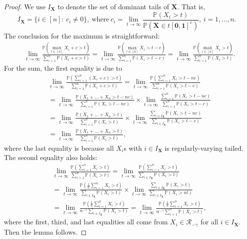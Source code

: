 \documentclass[12pt]{article}
\theoremstyle{plain}
\theoremstyle{plain}
\theoremstyle{definition}
\renewcommand{\Pr}{\mathbb{P}}
\begin{document}
\begin{proof}
We use $I_{\mathbf{X}}$ to denote the set of dominant tails of $\mathbf{X}$. That is,
\[
I_{\mathbf{X}}=\{i\in[n]:~c_i\neq0\},~\mathrm{where}~c_i=\lim_{t\to\infty}\frac{\Pr(X_i>t)}{\Pr(\mathbf{X}\in t[\mathbf{0},\mathbf{1}]^c)},~i=1,\dots,n.
\]
The conclusion for the maximum is straightforward:
\begin{align*}
&\lim_{t\to\infty}\frac{\Pr(\max_{i\in[n]} X_i+c>t)}{\sum_{i=1}^n\Pr(X_i+c>t)}
=\lim_{t\to\infty}\frac{\Pr(\max_{i\in[n]} X_i>t-c)}{\sum_{i=1}^n\Pr(X_i>t-c)}
=\lim_{t\to\infty}\frac{\Pr(\max_{i\in[n]} X_i>t)}{\sum_{i=1}^n\Pr(X_i>t)}.
\end{align*}
For the sum, the first equality is due to 
\begin{align*}
&\lim_{t\to\infty}\frac{\Pr(\sum_{i=1}^n (X_i+c)>t)}{\sum_{i=1}^n\Pr(X_i+c>t)}
=\lim_{t\to\infty}\frac{\Pr(\sum_{i=1}^n X_i>t - n c)}{\sum_{i=1}^n\Pr(X_i>t-c)}\\
&=\lim_{t\to\infty}\frac{\Pr( X_1+\dots+ X_n>t - n c)}{\sum_{i=1}^n\Pr( X_i>t - n c)}\times\lim_{t\to\infty}\frac{\sum_{i=1}^n\Pr(X_i>t - n c)}{\sum_{i=1}^n\Pr(X_i>t-c)}\\
&=\lim_{t\to\infty}\frac{\Pr(X_1 + \dots + X_n > t)}{\sum_{i=1}^n\Pr(X_i>t)}
\times\lim_{t\to\infty}\frac{\sum_{i\in I_{\mathbf{X}}}\Pr(X_i>t - n c)}{\sum_{i\in I_{\mathbf{X}}}\Pr(X_i>t-c)} \\
&=\lim_{t\to\infty}\frac{\Pr(X_1 + \dots + X_n > t)}{\sum_{i=1}^n\Pr(X_i>t)},
\end{align*}
where the last equality is because all $X_i$s with $i\in I_{\mathbf{X}}$ is regularly-varying tailed. 
The second equality also holds:
\begin{align*}
&\lim_{t\to\infty}\frac{\Pr(\sum_{i=1}^n X_i>t)}{\sum_{i=1}^n\Pr(X_i>t)}
=\lim_{t\to\infty}\frac{\Pr(\sum_{i=1}^n X_i>t )}{\sum_{i\in I_{\mathbf{X}}}\Pr(X_i>t)}\\
&=\lim_{t\to\infty}\frac{\Pr(\frac{1}{n}\sum_{i=1}^n X_i>t)}{\sum_{i\in I_{\mathbf{X}}}\Pr( X_i>t)}\times\lim_{t\to\infty}\frac{\sum_{i\in I_{\mathbf{X}}}\Pr(X_i>t)}{\sum_{i\in I_{\mathbf{X}}}\Pr(X_i>nt)}\\
&=\lim_{t\to\infty}\frac{\Pr(\frac{1}{n}\sum_{i=1}^n X_i > t)}{n^{-\gamma}\sum_{i\in I_{\mathbf{X}}}\Pr(X_i>t)}
=\lim_{t\to\infty}\frac{\Pr(\frac{1}{n}\sum_{i=1}^n X_i > t)}{n^{-\gamma}\sum_{i=1}^n\Pr(X_i>t)},
\end{align*}
where the first, third, and last equalities all come from $X_i\in\mathcal{R}_{-\gamma}$ for all $i\in I_{\mathbf{X}}$.
Then the lemma follows.
\end{proof}
\end{document}
